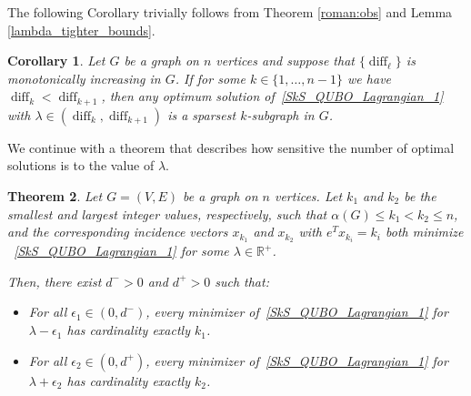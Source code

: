 \documentclass{article}
\DeclareMathOperator{\diff}{diff}
\newtheorem{thm}{Theorem}
\newtheorem{cor}[thm]{Corollary}
\begin{document}
The following Corollary trivially follows from Theorem \ref{roman:obs} and Lemma \ref{lambda_tighter_bounds}.
\begin{cor}\label{corollary_LR_diff_l}
Let $G$ be a graph on $n$ vertices and suppose that $\{\diff_\ell\}$ is monotonically increasing in $G$. If for some  $k \in \{1, \ldots, n-1\}$ we have $\diff_k < \diff_{k+1}$, then  any optimum solution of~\eqref{SkS_QUBO_Lagrangian_1} with $\lambda \in (\diff_k,\diff_{k+1})$ is a sparsest $k$-subgraph in $G$.
\end{cor}

We continue with a theorem that describes how sensitive the number of optimal solutions is to the value of $\lambda$.

\begin{thm} \label{thm: boundary_ks}
Let $G = (V, E)$ be a graph on $n$ vertices. 
Let $k_1$ and $k_2$ be  the smallest and largest integer values, respectively, such that $\alpha(G) \leq k_1< k_2 \leq n$, and the corresponding incidence vectors $x_{k_1}$ and $x_{k_2}$ with $e^Tx_{k_i}=k_i$ both minimize  ~\eqref{SkS_QUBO_Lagrangian_1} for some $\lambda \in \mathbb{R}^+$.  




Then, there exist $d^- > 0$ and $d^+ > 0$ such that:  
\begin{itemize}
    \item For all $\epsilon_1 \in (0, d^-)$, every minimizer of~\eqref{SkS_QUBO_Lagrangian_1} for $\lambda - \epsilon_1$ has cardinality exactly $k_1$.
    \item For all $\epsilon_2 \in (0, d^+)$, every minimizer of~\eqref{SkS_QUBO_Lagrangian_1} for $\lambda + \epsilon_2$ has cardinality exactly $k_2$.
\end{itemize} 
\end{thm}
\end{document}
